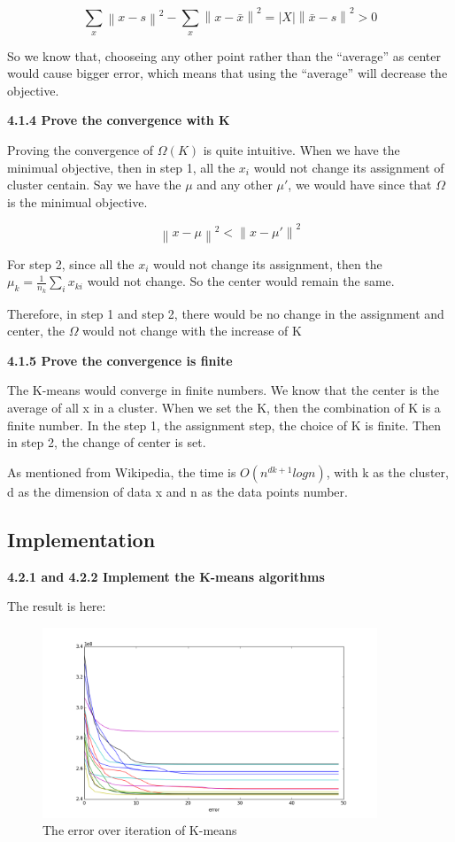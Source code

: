 \documentclass{article} %
\newcommand{\norm}[1]{\left\lVert #1 \right\rVert}
\newcommand{\abs}[1]{\left\lvert #1 \right\rvert}
\begin{document}
\begin{equation}
\sum_x \norm{x - s}^2 - \sum_x \norm{x - \bar{x}}^2 =
\abs{X} \norm{\bar{x}-s}^2 > 0
\end{equation}

So we know that, chooseing any other point rather than the ``average'' as center
would cause bigger error, which means that using the ``average'' will decrease
the objective.

\textbf{4.1.4 Prove the convergence with K}

Proving the convergence of $\Omega (K)$ is quite intuitive. When we have the
minimual objective, then in step 1, all the $x_i$ would not change its
assignment of cluster centain. Say we have the $\mu$ and any other $\mu'$, we
would have since that $\Omega$ is the minimual objective.

\begin{equation}
\norm{x - \mu}^2 < \norm{x - \mu'}^2
\end{equation}

For step 2, since all the $x_i$ would not change its assignment, then the $\mu_k =
\frac{1}{n_k} \sum_i x_{ki}$ would not change. So the center would remain the
same.

Therefore, in step 1 and step 2, there would be no change in the assignment and
center, the $\Omega$ would not change with the increase of K

\textbf{4.1.5 Prove the convergence is finite}

The K-means would converge in finite numbers. We know that the center is the
average of all x in a cluster. When we set the K, then the combination of K is a
finite number. In the step 1, the assignment step, the choice of K is
finite. Then in step 2, the change of center is set.

As mentioned from Wikipedia, the time is $O(n^{dk+1} logn)$, with k as the
cluster, d as the dimension of data x and n as the data points number.


\subsection{Implementation}

\textbf{4.2.1 and 4.2.2 Implement the K-means algorithms}

The result is here:

\begin{figure}[!htbp]
\begin{center}
\includegraphics[width=100mm]{pic/q42.png}
\end{center}
\caption{The error over iteration of K-means}
\end{figure}
\end{document}
